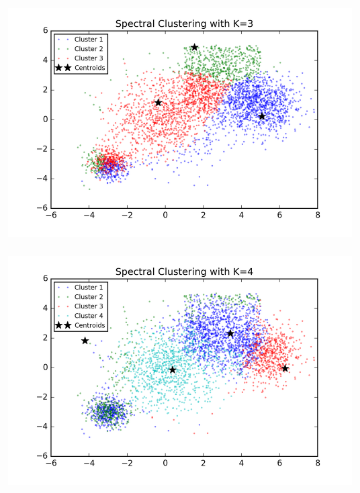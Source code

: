 \begin{figure}[htb]
        \centering
        \begin{subfigure}[b]{0.475\textwidth}
            \centering
            \includegraphics[width=\textwidth]{./figures/bigClustering_spectral_3.png}
        \end{subfigure}
        \hfill
        \begin{subfigure}[b]{0.475\textwidth}  
            \centering 
            \includegraphics[width=\textwidth]{./figures/bigClustering_spectral_4.png}
        \end{subfigure}
        \begin{subfigure}[b]{0.475\textwidth}  
            \centering 

\end{subfigure}
\end{figure}
